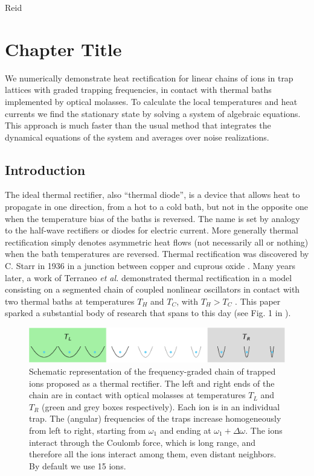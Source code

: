 Reid%

\chapter{Chapter Title}
\label{Chapter1}
%
We numerically demonstrate heat rectification for linear chains of  ions in trap lattices with  graded  trapping frequencies, in contact with
thermal baths implemented by optical molasses.  To calculate the local temperatures and heat currents we find the stationary state
by solving a system of algebraic equations. This approach is much faster than the usual method
that integrates the dynamical equations of the system and averages over noise realizations.
%
\newpage
%
\section{Introduction\label{IntroductionChapter1}}

The ideal thermal rectifier, also ``thermal diode'',  is a device that allows heat to propagate in one direction, from a hot to a cold bath, but not in the opposite one when the temperature bias of the baths is  reversed. The name is set by analogy to the
half-wave rectifiers or diodes for electric current. More generally thermal rectification simply denotes
asymmetric heat flows (not necessarily all or nothing) when the bath temperatures are reversed.
 Thermal rectification was discovered by C. Starr in 1936 in a junction between copper and cuprous oxide \cite{Starr1936}. Many years later, a work of Terraneo \textit{et al.} demonstrated thermal rectification in a model
consisting on a segmented chain of coupled nonlinear oscillators  in contact with two thermal baths at temperatures $T_H$ and $T_C$, with $T_H > T_C$ \cite{Terraneo2002}. This paper sparked a substantial body of research  that spans to this day \cite{Pereira2019} (see Fig. 1 in \cite{Roberts2011}).

\begin{figure}
    \centering
    \includegraphics[width=0.9\linewidth]{Figures/Diagram.eps}
    \caption{Schematic representation  of the frequency-graded chain of trapped ions proposed as a thermal rectifier. The left and right ends of the chain are in contact with optical molasses at temperatures $T_L$ and $T_R$ (green and grey boxes respectively). Each ion is in an individual trap. The (angular) frequencies of the traps increase homogeneously from left to right, starting from $\omega_1$ and ending at $\omega_1+\Delta\omega$. The ions interact through the Coulomb force, which is long range, and therefore all the ions interact among them, even distant neighbors. By default  we use 15 ions.}
    \label{fig:Diagram}
\end{figure}

